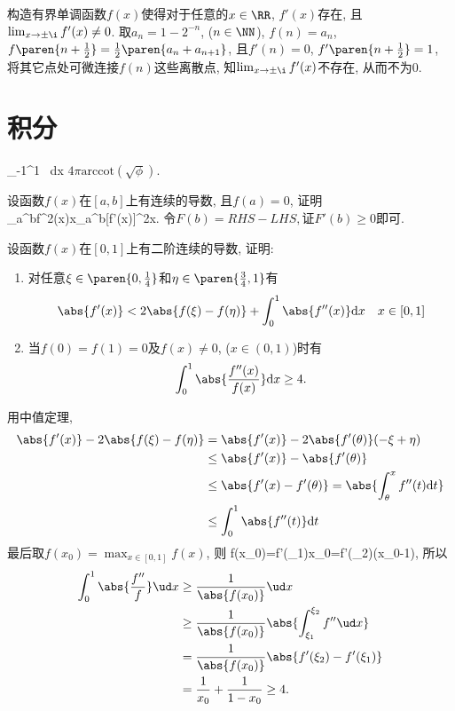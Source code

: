 \bq{}{}
构造有界单调函数$f(x)$使得对于任意的$x\in\RR$, $f'(x)$存在, 且$\lim_{x\to\pm\i}f'(x)\ne0$.
\eq
\ba
取$a_n=1-2^{-n}$, ($n\in\NN$), $f(n)=a_n$, $f\paren{n+\frac12}=\frac12\paren{a_n+a_{n+1}}$, 
且$f'(n)=0$, $f'\paren{n+\frac12}=1$, 将其它点处可微连接$f(n)$这些离散点, 知$\lim_{x\to\pm\i}f'(x)$不存在, 从而不为0.
\ea

\section{积分}

\bq{}{}
\bee
\int_{-1}^1  \, dx
\eee
\eq
\ba
$4\pi \mathrm{arccot}(\sqrt{\phi}).$
\ea

\bq{}{}
设函数$f(x)$在$[a,b]$上有连续的导数, 且$f(a)=0$, 证明
\bee
\int_{a}^{b}f^{2}(x)x\le{}\int_{a}^{b}[f'(x)]^{2}x.
\eee
\eq
\ba
令$F(b)=RHS-LHS,$证$F'(b)\ge0$即可.
\ea

\bq{}{}
设函数$f(x)$在$[0,1]$上有二阶连续的导数, 证明:
\begin{enumerate}
\item 对任意$\xi\in\paren{0,\frac{1}{4}}$和$\eta\in\paren{\frac{3}{4},1}$有
$$
\abs{f'(x)}<2\abs{f(\xi)-f(\eta)}+\int_{0}^{1}\abs{f''(x)}\mathrm{d}x\quad x\in[0,1]
$$
\item 当$f(0)=f(1)=0$及$f(x)\ne0$, ($x\in(0,1)$)时有
$$
\int_{0}^{1}\abs{\frac{f''(x)}{f(x)}}\mathrm{d}x\ge4.
$$
\end{enumerate}
\eq
\ba
用中值定理, 
\begin{align*}
\abs{f'(x)}-2\abs{f(\xi)-f(\eta)} & =\abs{f'(x)}-2\abs{f'(\theta)}(-\xi+\eta)\\
 & \le\abs{f'(x)}-\abs{f'(\theta)}\\
 & \le\abs{f'(x)-f'(\theta)}=\abs{\int_{\theta}^{x}f''(t)\mathrm{d}t}\\
 & \le\int_{0}^{1}\abs{f''(t)}\mathrm{d}t
\end{align*}
最后取$f(x_{0})=\max_{x\in[0,1]}f(x)$, 则
\bee
f(x_0)=f'(\xi_1)x_0=f'(\xi_2)(x_0-1),
\eee
所以
\begin{align*}
\int_0^1\abs{\frac{f''}{f}}\ud x & \ge\frac1{\abs{f(x_0)}}\ud x\\
 & \ge \frac1{\abs{f(x_0)}}\abs{\int_{\xi_1}^{\xi_2}f''\ud x}\\
 & = \frac{1}{\abs{f(x_0)}}\abs{f'(\xi_2)-f'(\xi_1)}\\
 & = \frac1{x_0}+\frac1{1-x_0}\ge4.
\end{align*}
\ea

